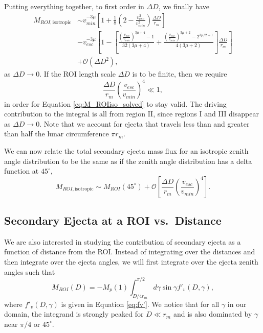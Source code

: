 \documentclass{hitec}
\numberwithin{equation}{section}
\begin{document}
Putting everything together, to first order in $\Delta D$, we finally have
\begin{align}\label{eq:M_ROIiso_solved}
M_{ROI,\text{isotropic}}
&\sim
v_{min}^{-3\mu}\left[1 + \frac{1}{8}\left(2-\frac{v_{esc}^2}{v_{min}^2}\right)\frac{\Delta D}{r_m}\right] \\\nonumber
&-v_{esc}^{-3\mu}\left[1-\left[ \frac{\left(\frac{v_{esc}}{v_{min}}\right)^{3\mu+4}-1}{32(3\mu+4)} + \frac{\left(\frac{v_{esc}}{v_{min}}\right)^{3\mu+2}-2^{3\mu/2+1}}{4(3\mu+2)} \right]\frac{\Delta D}{r_m}\right]\\\nonumber
&+\mathcal{O}(\Delta D^2),
\end{align}
as $\Delta D\to 0$. If the ROI length scale $\Delta D$ is to be finite, then we require
\begin{equation}
\frac{\Delta D}{r_m}\left(\frac{v_{esc}}{v_{min}}\right)^{4} \ll 1,
\end{equation}
in order for Equation \eqref{eq:M_ROIiso_solved} to stay valid. The driving contribution to the integral is all from region II, since regions I and III disappear as $\Delta D\to 0$. Note that we account for ejecta that travels less than and greater than half the lunar circumference $\pi r_m$.

We can now relate the total secondary ejecta mass flux for an isotropic zenith angle distribution to be the same as if the zenith angle distribution has a delta function at $45^\circ$,
\begin{equation}
M_{ROI,\text{isotropic}} \sim M_{ROI}(45^\circ) + \mathcal{O}\left[\frac{\Delta D}{r_m}\left(\frac{v_{esc}}{v_{min}}\right)^{4}\right].
\end{equation}




\subsection{Secondary Ejecta at a ROI vs.\ Distance}

We are also interested in studying the contribution of secondary ejecta as a function of distance from the ROI. Instead of integrating over the distances and then integrate over the ejecta angles, we will first integrate over the ejecta zenith angles such that
\begin{equation}\label{M_ROI_D}
M_{ROI}(D) = -M_p(1)\int_{D/4r_m}^{\pi/2}d\gamma\sin\gamma f'_v(D,\gamma),
\end{equation}
where $f'_v(D,\gamma)$ is given in Equation \eqref{eq:fv'}. We notice that for all $\gamma$ in our domain, the integrand is strongly peaked for $D\ll r_m$ and is also dominated by $\gamma$ near $\pi/4$ or $45^\circ$.
\end{document}

